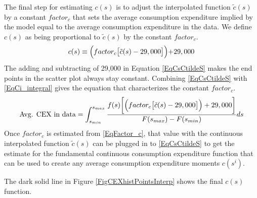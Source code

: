 \documentclass[letterpaper,12pt]{article}
\theoremstyle{definition}
\begin{document}
      The final step for estimating $c(s)$ is to adjust the interpolated function $\tilde{c}(s)$ by a constant $factor_c$ that sets the average consumption expenditure implied by the model equal to the average consumption expenditure in the data. We define $c(s)$ as being proportional to $\tilde{c}(s)$ by the constant $factor_c$.
      \begin{equation}\label{EqCsCtildeS}
        c(s) \equiv \Bigl(factor_c \bigl[\tilde{c}(s) - 29,000\bigr]\Bigl) + 29,000
      \end{equation}
      The adding and subtracting of 29,000 in Equation \eqref{EqCsCtildeS} makes the end points in the scatter plot always stay constant. Combining \eqref{EqCsCtildeS} with \eqref{EqCi_integral} gives the equation that characterizes the constant $factor_c$.
      \begin{equation}\label{EqFactor_c}
        \text{Avg. CEX in data} = \int_{s_{min}}^{s_{max}}\frac{f(s)\biggl[\Bigl(factor_c \bigl[\tilde{c}(s) - 29,000\bigr]\Bigr) + 29,000\biggr]}{F(s_{max}) - F(s_{min})}ds
      \end{equation}
      Once $factor_c$ is estimated from \eqref{EqFactor_c}, that value with the continuous interpolated function $\tilde{c}(s)$ can be plugged in to \eqref{EqCsCtildeS} to get the estimate for the fundamental continuous consumption expenditure function that can be used to create any average consumption expenditure moments $c(s^i)$.

      The dark solid line in Figure \ref{FigCEXhistPointsInterp} shows the final $c(s)$ function.


\end{document}

